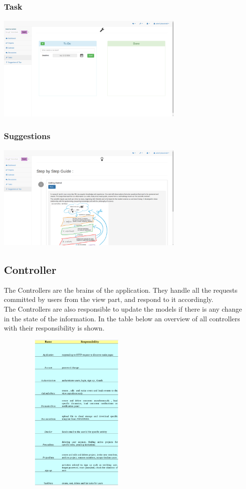 \subsubsection{Task}

\begin{center}
\includegraphics[height=200px, width=350px]{./img/dsgn_img/task.png}
	
\end{center}

\subsubsection{Suggestions}

\begin{center}
\includegraphics[height=200px, width=350px]{./img/dsgn_img/suggestions.png}
	
\end{center}
\newpage
\subsection{Controller}
The Controllers are the brains of the application. They handle all the requests committed by users from the view part, and respond to it accordingly.\\
The Controllers are also responsible to update the models if there is any change in the state of the information. In the table below an overview of all controllers with their responsibility is shown.\\

\begin{center}
\includegraphics[height=300px, width=300px]{./img/dsgn_img/controllers.png}
	
\end{center}